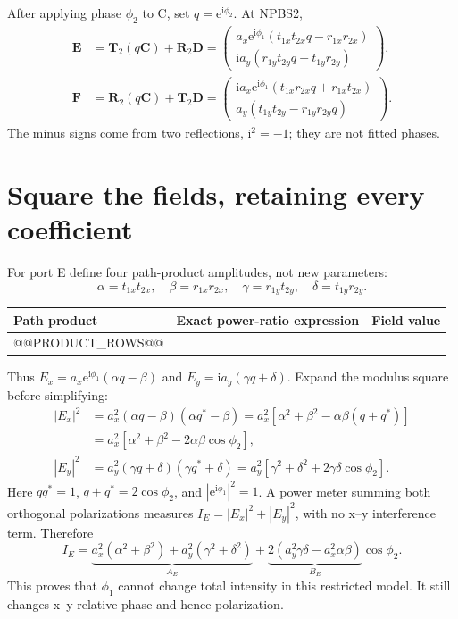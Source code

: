 \documentclass[11pt,a4paper]{article}
\newcommand{\ee}{\mathrm e}
\newcommand{\ii}{\mathrm i}
\begin{document}
After applying phase $\phi_2$ to C, set $q=\ee^{\ii\phi_2}$. At NPBS2,
\begin{align}
\mathbf E&=\mathbf T_2(q\mathbf C)+\mathbf R_2\mathbf D
=\begin{pmatrix}
a_x\ee^{\ii\phi_1}(t_{1x}t_{2x}q-r_{1x}r_{2x})\\
\ii a_y(r_{1y}t_{2y}q+t_{1y}r_{2y})
\end{pmatrix},\\
\mathbf F&=\mathbf R_2(q\mathbf C)+\mathbf T_2\mathbf D
=\begin{pmatrix}
\ii a_x\ee^{\ii\phi_1}(t_{1x}r_{2x}q+r_{1x}t_{2x})\\
a_y(t_{1y}t_{2y}-r_{1y}r_{2y}q)
\end{pmatrix}.
\end{align}
The minus signs come from two reflections, $\ii^2=-1$; they are not fitted phases.

\section{Square the fields, retaining every coefficient}
For port E define four path-product amplitudes, not new parameters:
\[
\alpha=t_{1x}t_{2x},\quad\beta=r_{1x}r_{2x},\quad
\gamma=r_{1y}t_{2y},\quad\delta=t_{1y}r_{2y}.
\]
\begin{center}\small
\begin{tabular}{lll}\toprule
Path product & Exact power-ratio expression & Field value \\\midrule
@@PRODUCT_ROWS@@
\bottomrule\end{tabular}\end{center}
Thus $E_x=a_x\ee^{\ii\phi_1}(\alpha q-\beta)$ and
$E_y=\ii a_y(\gamma q+\delta)$. Expand the modulus square before simplifying:
\begin{align}
|E_x|^2&=a_x^2(\alpha q-\beta)(\alpha q^*-\beta)
=a_x^2[\alpha^2+\beta^2-\alpha\beta(q+q^*)]\\
&=a_x^2[\alpha^2+\beta^2-2\alpha\beta\cos\phi_2],\\
|E_y|^2&=a_y^2(\gamma q+\delta)(\gamma q^*+\delta)
=a_y^2[\gamma^2+\delta^2+2\gamma\delta\cos\phi_2].
\end{align}
Here $qq^*=1$, $q+q^*=2\cos\phi_2$, and
$|\ee^{\ii\phi_1}|^2=1$. A power meter summing both orthogonal polarizations
measures $I_E=|E_x|^2+|E_y|^2$, with no x--y interference term. Therefore
\begin{equation}
\boxed{I_E=\underbrace{a_x^2(\alpha^2+\beta^2)+a_y^2(\gamma^2+\delta^2)}_{A_E}
+\underbrace{2(a_y^2\gamma\delta-a_x^2\alpha\beta)}_{B_E}\cos\phi_2.}
\end{equation}
This proves that $\phi_1$ cannot change total intensity in this restricted model.
It still changes x--y relative phase and hence polarization.
\end{document}
